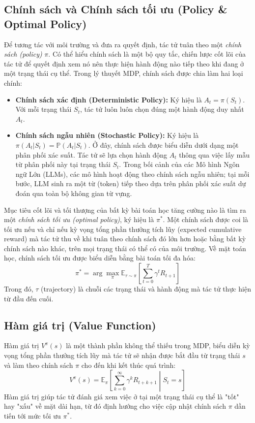\documentclass[12pt,a4paper]{report}
\begin{document}
\subsection{Chính sách và Chính sách tối ưu (Policy \& Optimal Policy)}

Để tương tác với môi trường và đưa ra quyết định, tác tử tuân theo một \textit{chính sách (policy)} $\pi$. Có thể hiểu chính sách là một bộ quy tắc, chiến lược cốt lõi của tác tử để quyết định xem nó nên thực hiện hành động nào tiếp theo khi đang ở một trạng thái cụ thể. Trong lý thuyết MDP, chính sách được chia làm hai loại chính:
\begin{itemize}
    \item \textbf{Chính sách xác định (Deterministic Policy):} Ký hiệu là $A_t = \pi(S_t)$. Với mỗi trạng thái $S_t$, tác tử luôn luôn chọn đúng một hành động duy nhất $A_t$.
    \item \textbf{Chính sách ngẫu nhiên (Stochastic Policy):} Ký hiệu là $\pi(A_t|S_t) = \mathbb{P}(A_t|S_t)$. Ở đây, chính sách được biểu diễn dưới dạng một phân phối xác suất. Tác tử sẽ lựa chọn hành động $A_t$ thông qua việc lấy mẫu từ phân phối này tại trạng thái $S_t$. Trong bối cảnh của các Mô hình Ngôn ngữ Lớn (LLMs), các mô hình hoạt động theo chính sách ngẫu nhiên; tại mỗi bước, LLM sinh ra một từ (token) tiếp theo dựa trên phân phối xác suất dự đoán qua toàn bộ không gian từ vựng.
\end{itemize}

Mục tiêu cốt lõi và tối thượng của bất kỳ bài toán học tăng cường nào là tìm ra một \textit{chính sách tối ưu (optimal policy)}, ký hiệu là $\pi^*$. Một chính sách được coi là tối ưu nếu và chỉ nếu kỳ vọng tổng phần thưởng tích lũy (expected cumulative reward) mà tác tử thu về khi tuân theo chính sách đó lớn hơn hoặc bằng bất kỳ chính sách nào khác, trên mọi trạng thái có thể có của môi trường. Về mặt toán học, chính sách tối ưu được biểu diễn bằng bài toán tối đa hóa:
\begin{equation}
    \pi^* = \arg\max_\pi \mathbb{E}_{\tau \sim \pi} \left[ \sum_{t=0}^T \gamma^t R_{t+1} \right]
\end{equation}
Trong đó, $\tau$ (trajectory) là chuỗi các trạng thái và hành động mà tác tử thực hiện từ đầu đến cuối.

\subsection{Hàm giá trị (Value Function)}
Hàm giá trị $V^\pi(s)$ là một thành phần không thể thiếu trong MDP, biểu diễn kỳ vọng tổng phần thưởng tích lũy mà tác tử sẽ nhận được bắt đầu từ trạng thái $s$ và làm theo chính sách $\pi$ cho đến khi kết thúc quá trình:
\begin{equation}
    V^\pi(s) = \mathbb{E}_\pi \left[ \sum_{k=0}^\infty \gamma^k R_{t+k+1} \middle| S_t = s \right]
\end{equation}
Hàm giá trị giúp tác tử đánh giá xem việc ở tại một trạng thái cụ thể là "tốt" hay "xấu" về mặt dài hạn, từ đó định hướng cho việc cập nhật chính sách $\pi$ dần tiến tới mức tối ưu $\pi^*$.
\end{document}
